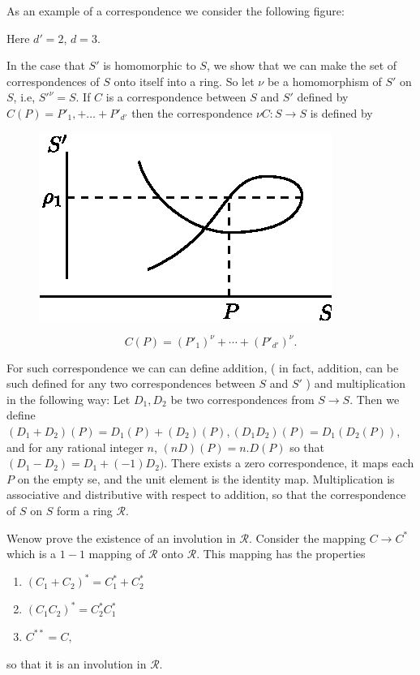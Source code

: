 As an example of a correspondence we consider the following figure:

  Here $d' = 2$, $d = 3$. 
  
  In the case that $S'$ is homomorphic to $S$, we show that we can
  make the set of correspondences of $S$ onto itself into a ring. So
  let $\nu$ be a homomorphism of $S'$ on $S$, i.e, $S'^\nu = S$. If
  $C$ is a correspondence between $S$ and $S'$ defined by $C(P)=P'_1, +
  \ldots + P'_{d'}$ then the correspondence $\nu C : S \to S $ is defined by  
  \begin{figure}[H]
    \centerline{\includegraphics{vol9-figures/fig9-10.eps}}
  \end{figure}
  $$
  C(P) = (P'_1)^\nu + \cdots+ (P'_{d'})^\nu.  
  $$

  For such correspondence we can can define addition, ( in fact,
  addition, can be such defined for any two correspondences between $S$
  and $S'$ ) and multiplication in the following way: Let $D_1,  D_2$
  be two correspondences from $S \to S$. Then we define $(D_1 + D_2)
  (P) = D_1 (P)+(D_2) (P), (D_1 D_2) (P) = D_1 (D_2(P))$, and
  for any rational integer $n$, $(n D)$\break $(P) = n.  D (P)$ so that $(D_1 -
  D_2) = D_1 + (-1) D_2)$. There exists a zero correspondence, it maps
  each $P$ on the empty se, and the unit element is the identity
  map. Multiplication is associative and distributive with respect to
  addition,  so that the correspondence of $S$ on $S$ form a ring
  $\mathscr{R}$.  

  We\pageoriginale now prove the existence of an involution in
  $\mathscr{R}$. Consider the mapping $C \to C^*$   which is a $1-1$
  mapping of $\mathscr{R}$ onto $\mathscr{R}$. This mapping has the
  properties  
  \begin{enumerate}[1.]
  \item $(C_1 + C_2 )^* =C^*_1 + C^*_2 $
  \item $(C_1  C_2 )^* =C^*_2 C^*_1 $
  \item $C^{**} = C, $
  \end{enumerate}
  so that it is an involution in $\mathscr{R}$. 
  
